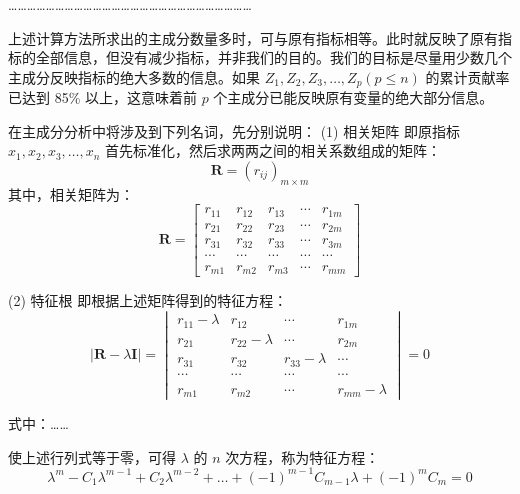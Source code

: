 \dots\dots\dots\dots\dots\dots\dots\dots\dots\dots\dots\dots\dots\dots\dots\dots\dots\dots\dots\dots\dots\dots\dots\dots\dots\dots

上述计算方法所求出的主成分数量多时，可与原有指标相等。此时就反映了原有指标的全部信息，但没有减少指标，并非我们的目的。我们的目标是尽量用少数几个主成分反映指标的绝大多数的信息。如果 $Z_1, Z_2, Z_3, \dots, Z_p (p \le n)$ 的累计贡献率已达到 85\% 以上，这意味着前 $p$ 个主成分已能反映原有变量的绝大部分信息。

在主成分分析中将涉及到下列名词，先分别说明：
(1) 相关矩阵
即原指标 $x_1, x_2, x_3, \dots, x_n$ 首先标准化，然后求两两之间的相关系数组成的矩阵：
\begin{equation}
    \mathbf{R} = (r_{ij})_{m \times m}
\end{equation}
其中，相关矩阵为：
\begin{equation}
    \mathbf{R} = 
    \begin{bmatrix}
        r_{11} & r_{12} & r_{13} & \cdots & r_{1m} \\
        r_{21} & r_{22} & r_{23} & \cdots & r_{2m} \\
        r_{31} & r_{32} & r_{33} & \cdots & r_{3m} \\
        \cdots & \cdots & \cdots & \cdots & \cdots \\
        r_{m1} & r_{m2} & r_{m3} & \cdots & r_{mm} 
    \end{bmatrix}
\end{equation}

(2) 特征根
即根据上述矩阵得到的特征方程：
\begin{equation}
    | \mathbf{R} - \lambda \mathbf{I} | = 
    \begin{vmatrix}
        r_{11}-\lambda & r_{12} & \cdots & r_{1m} \\
        r_{21} & r_{22}-\lambda & \cdots & r_{2m} \\
        r_{31} & r_{32} & r_{33}-\lambda & \cdots \\
        \cdots & \cdots & \cdots & \cdots \\
        r_{m1} & r_{m2} & \cdots & r_{mm}-\lambda
    \end{vmatrix} = 0
\end{equation}

式中：\dots\dots

使上述行列式等于零，可得 $\lambda$ 的 $n$ 次方程，称为特征方程：
\begin{equation}
    \lambda^m - C_1 \lambda^{m-1} + C_2 \lambda^{m-2} + \dots + (-1)^{m-1} C_{m-1} \lambda + (-1)^m C_m = 0
\end{equation}

